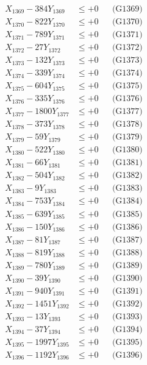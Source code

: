\documentclass[a4paper,10pt]{article}
\begin{document}
{\begin{align}
X_{1369} - 384Y_{1369} &\leq +0 && \text{(G1369)} \\
X_{1370} - 822Y_{1370} &\leq +0 && \text{(G1370)} \\
\allowbreak
X_{1371} - 789Y_{1371} &\leq +0 && \text{(G1371)} \\
X_{1372} - 27Y_{1372} &\leq +0 && \text{(G1372)} \\
X_{1373} - 132Y_{1373} &\leq +0 && \text{(G1373)} \\
X_{1374} - 339Y_{1374} &\leq +0 && \text{(G1374)} \\
X_{1375} - 604Y_{1375} &\leq +0 && \text{(G1375)} \\
X_{1376} - 335Y_{1376} &\leq +0 && \text{(G1376)} \\
X_{1377} - 1800Y_{1377} &\leq +0 && \text{(G1377)} \\
X_{1378} - 373Y_{1378} &\leq +0 && \text{(G1378)} \\
X_{1379} - 59Y_{1379} &\leq +0 && \text{(G1379)} \\
X_{1380} - 522Y_{1380} &\leq +0 && \text{(G1380)} \\
\allowbreak
X_{1381} - 66Y_{1381} &\leq +0 && \text{(G1381)} \\
X_{1382} - 504Y_{1382} &\leq +0 && \text{(G1382)} \\
X_{1383} - 9Y_{1383} &\leq +0 && \text{(G1383)} \\
X_{1384} - 753Y_{1384} &\leq +0 && \text{(G1384)} \\
X_{1385} - 639Y_{1385} &\leq +0 && \text{(G1385)} \\
X_{1386} - 150Y_{1386} &\leq +0 && \text{(G1386)} \\
X_{1387} - 81Y_{1387} &\leq +0 && \text{(G1387)} \\
X_{1388} - 819Y_{1388} &\leq +0 && \text{(G1388)} \\
X_{1389} - 780Y_{1389} &\leq +0 && \text{(G1389)} \\
X_{1390} - 39Y_{1390} &\leq +0 && \text{(G1390)} \\
\allowbreak
X_{1391} - 940Y_{1391} &\leq +0 && \text{(G1391)} \\
X_{1392} - 1451Y_{1392} &\leq +0 && \text{(G1392)} \\
X_{1393} - 13Y_{1393} &\leq +0 && \text{(G1393)} \\
X_{1394} - 37Y_{1394} &\leq +0 && \text{(G1394)} \\
X_{1395} - 1997Y_{1395} &\leq +0 && \text{(G1395)} \\
X_{1396} - 1192Y_{1396} &\leq +0 && \text{(G1396)} \\

\end{align}}
\end{document}
